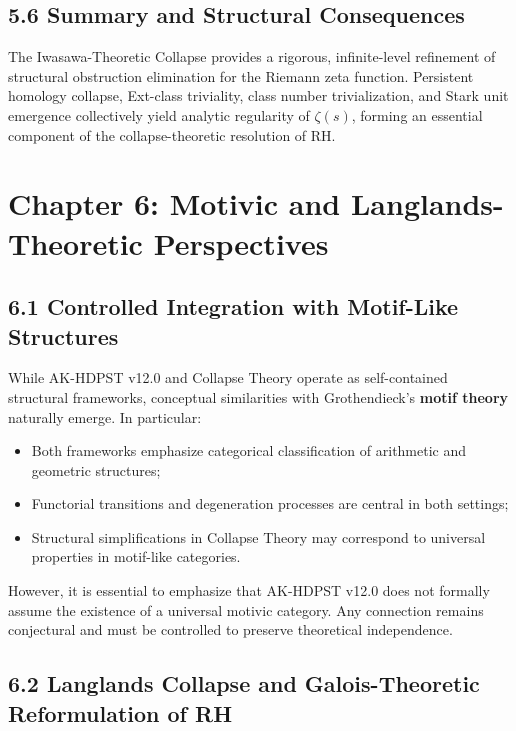 \documentclass[11pt]{article}
\begin{document}
\subsection*{5.6 Summary and Structural Consequences}

The Iwasawa-Theoretic Collapse provides a rigorous, infinite-level refinement of structural obstruction elimination for the Riemann zeta function. Persistent homology collapse, Ext-class triviality, class number trivialization, and Stark unit emergence collectively yield analytic regularity of $\zeta(s)$, forming an essential component of the collapse-theoretic resolution of RH.



\section{Chapter 6: Motivic and Langlands-Theoretic Perspectives}

\subsection*{6.1 Controlled Integration with Motif-Like Structures}

While AK-HDPST v12.0 and Collapse Theory operate as self-contained structural frameworks, conceptual similarities with Grothendieck's \textbf{motif theory} naturally emerge. In particular:

\begin{itemize}
    \item Both frameworks emphasize categorical classification of arithmetic and geometric structures;
    \item Functorial transitions and degeneration processes are central in both settings;
    \item Structural simplifications in Collapse Theory may correspond to universal properties in motif-like categories.
\end{itemize}

However, it is essential to emphasize that AK-HDPST v12.0 does not formally assume the existence of a universal motivic category. Any connection remains conjectural and must be controlled to preserve theoretical independence.

\subsection*{6.2 Langlands Collapse and Galois-Theoretic Reformulation of RH}
\end{document}
